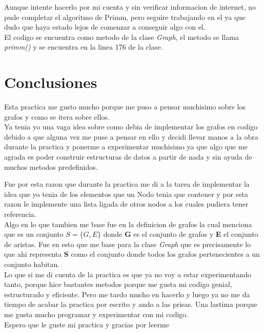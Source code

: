 \documentclass{article}
\begin{document}
				Aunque intente hacerlo por mi cuenta y sin verificar informacion de internet, no pude completar el algoritmo de Primm, pero seguire trabajando en el ya que dudo que haya estado lejos de comenzar a conseguir algo con el.\\
				
				El codigo se encuentra como metodo de la clase \emph{Graph}, el metodo se llama \emph{primm()} y se encuentra en la linea 176 de la clase.
				
			\newpage
	
	
	\section{Conclusiones}
	
		Esta practica me gusto mucho porque me puso a pensar muchisimo sobre los grafos y como se itera sobre ellos.\\
		
		Ya tenia yo una vaga idea sobre como debia de implementar los grafos en codigo debido a que alguna vez me puse a pensar en ello y decidi llevar manos a la obra durante la practica y ponerme a experimentar muchisimo ya que algo que me agrada es poder construir estructuras de datos a partir de nada y sin ayuda de muchos metodos predefinidos.
		
		Fue por esta razon que durante la practica me di a la tarea de implementar la idea que yo tenia de los elementos que un Nodo tenia que contener y por esta razon le implemente una lista ligada de otros nodos a los cuales pudiera tener referencia.\\
		
		Algo en lo que tambien me base fue en la definicion de grafos la cual menciona que es un conjunto $S = \{G, E\}$ donde \textbf{G} es el conjunto de grafos y \textbf{E} el conjunto de aristas. Fue en esto que me base para la clase \emph{Graph} que es precisamente lo que ahi representa \textbf{S} como el conjunto donde todos los grafos pertenecientes a un conjunto habitan.\\
		
		Lo que si me di cuenta de la practica es que ya no voy a estar experimentando tanto, porque hice bastantes metodos porque me gusta mi codigo genial, estructurado y eficiente. Pero me tardo mucho en hacerlo y luego ya no me da tiempo de acabar la practica por escrito y ando a las prisas. Una lastima porque me gusta mucho programar y experimentar con mi codigo.\\
		
		Espero que le guste mi practica y gracias por leerme\\
	
	
\end{document}

